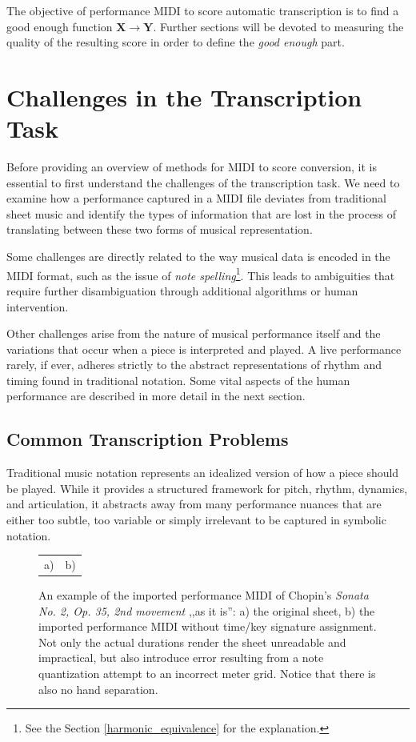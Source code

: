 The objective of performance MIDI to score automatic transcription is to find a good enough function $\mathbf{X}\to\mathbf{Y}$. Further sections will be devoted to measuring the quality of the resulting score in order to define the \emph{good enough} part. 

\section{Challenges in the Transcription Task}

Before providing an overview of methods for MIDI to score conversion, it is essential to first understand the challenges of the transcription task. We need to examine how a performance captured in a MIDI file deviates from traditional sheet music and identify the types of information that are lost in the process of translating between these two forms of musical representation.

Some challenges are directly related to the way musical data is encoded in the MIDI format, such as the issue of \emph{note spelling}\footnote{See the Section \ref{harmonic_equivalence} for the explanation.}. This leads to ambiguities that require further disambiguation through additional algorithms or human intervention.

Other challenges arise from the nature of musical performance itself and the variations that occur when a piece is interpreted and played. A live performance rarely, if ever, adheres strictly to the abstract representations of rhythm and timing found in traditional notation. Some vital aspects of the human performance are described in more detail in the next section.

\subsection{Common Transcription Problems}

Traditional music notation represents an idealized version of how a piece should be played. While it provides a structured framework for pitch, rhythm, dynamics, and articulation, it abstracts away from many performance nuances that are either too subtle, too variable or simply irrelevant to be captured in symbolic notation.

\begin{figure}[ht!]
\centering
\begin{tabular}{cc}a)

 & b)
\end{tabular}
\caption[An example of the imported performance MIDI of Chopin's \emph{Sonata No. 2, Op. 35, 2nd movement} ``as it is''.]{An example of the imported performance MIDI of Chopin's \emph{Sonata No. 2, Op. 35, 2nd movement} ,,as it is'': a) the original sheet, b) the imported performance MIDI without time/key signature assignment. Not only the actual durations render the sheet unreadable and impractical, but also introduce error resulting from a note quantization attempt to an incorrect meter grid. Notice that there is also no hand separation.}
\label{chopin_sonata}
\end{figure}

